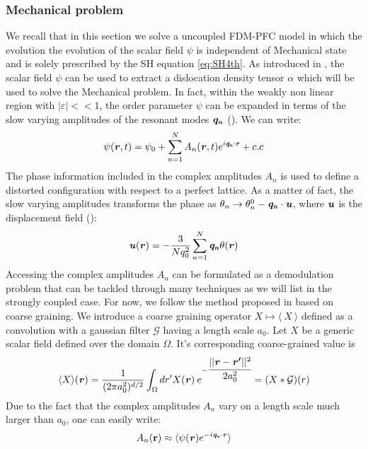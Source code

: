 \documentclass{article}
\begin{document}
\subsubsection{Mechanical problem}
We recall that in this section we solve a uncoupled FDM-PFC model in which the evolution the evolution of the scalar field $\psi$ is independent of Mechanical state and is solely prescribed by the SH equation \cref{eq:SH4th}. As introduced in \cite{upadhyayCouplingPhaseField2024}, the scalar field $\psi$ can be used to extract a dislocation density tensor $\alpha$ which will be used to solve the Mechanical problem. In fact, within the weakly non linear region with $|\varepsilon|<\!<1$, the order parameter $\psi$ can be expanded in terms of the slow varying amplitudes of the resonant modes $\bm{\mathit{q_n}}$ (\cite{skaugenDislocationdynamics2018}). We can write:
\begin{equation}
   \psi(\bm{\mathit{r}},t) = \psi_0 + \sum_{n=1}^{N} A_n(\bm{\mathit{r}},t) e^{i \bm{\mathit{q_n}}\cdot \bm{\mathit{r}}}+ c.c
\end{equation}
The phase information  included in the complex amplitudes $A_n$ is used to define a distorted configuration with respect to a perfect lattice. As a matter of fact, the slow varying amplitudes transforms the phase as $\theta_n \rightarrow \theta_n^0 -\bm{\mathit{q_n}}\cdot \bm{\mathit{u}}$, where $\bm{\mathit{u}}$ is the displacement field (\cite{skogvollphasefield2022}):
\begin{equation}
   \bm{\mathit{u}}(\bm{\mathit{r}}) = - \frac{3}{Nq_0^2} \sum_{n=1}^{N} \bm{\mathit{q_n}} \theta(\bm{\mathit{r}})
\end{equation}
Accessing the complex amplitudes $A_n$ can be formulated as a demodulation problem that can be tackled through many techniques as we will list in the strongly coupled case. For now, we follow the method proposed in \cite{skogvollphasefield2022} based on coarse graining. We introduce a coarse graining operator $X \longmapsto \langle\: X \: \rangle$ defined as a convolution with a gaussian filter $\mathcal{G}$ having a length scale $a_0$. Let $X$ be a generic scalar field defined over the domain $\Omega$. It's corresponding coarse-grained value is
\begin{equation}
   \langle X\rangle(\bm{\mathit{r}}) =  \frac{1}{(2\pi a_0^2)^{d/2}}\int_\Omega dr' X(\bm{\mathit{r}})  \: e^{-\cfrac{||\bm{\mathit{r}}-\bm{\mathit{r'}}||^2}{2a_0^2}} = (X * \mathcal{G})(r)
\end{equation}
Due to the fact that the complex amplitudes $A_n$ vary on a length scale much larger than $a_0$, one can easily write: 
\begin{equation}
   A_n(\mathbf{r}) \approx \langle \psi(\bm{\mathit{r}}) e^{-i \bm{\mathit{q_n}}\cdot \bm{\mathit{r}}}\rangle
\end{equation}
\end{document}
